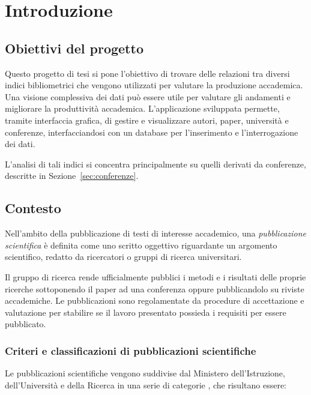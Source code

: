 \chapter{Introduzione}

\section{Obiettivi del progetto}

Questo progetto di tesi si pone l’obiettivo di trovare delle relazioni tra
diversi indici bibliometrici che vengono utilizzati  per valutare la produzione
accademica. Una visione complessiva dei dati può essere utile per valutare gli
andamenti e migliorare la produttività accademica. L’applicazione sviluppata
permette, tramite interfaccia grafica, di gestire e visualizzare autori, paper,
università e conferenze, interfacciandosi con un database per l’inserimento e
l’interrogazione dei dati.

L'analisi di tali indici si concentra principalmente su quelli derivati da conferenze,
descritte in Sezione~\ref{sec:conferenze}.


\section{Contesto}


Nell’ambito della pubblicazione di testi di interesse accademico, una
\textit{pubblicazione scientifica} è definita come uno scritto oggettivo
riguardante un argomento scientifico, redatto da ricercatori o gruppi di ricerca
universitari.

Il gruppo di ricerca rende ufficialmente pubblici i metodi e i risultati delle
proprie ricerche sottoponendo il paper ad una conferenza oppure pubblicandolo
su riviste accademiche. Le pubblicazioni sono regolamentate da procedure di
accettazione e valutazione per stabilire se il lavoro presentato possieda i
requisiti per essere pubblicato.

\subsection{Criteri e classificazioni di pubblicazioni scientifiche}

Le pubblicazioni scientifiche vengono suddivise dal Ministero dell'Istruzione,
dell'Università e della Ricerca in una serie di categorie
\cite{criteri2009pubblicazioni}, che risultano essere:

